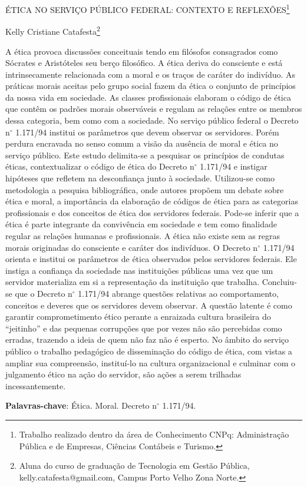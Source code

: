 \documentclass[article,12pt,onesidea,4paper,english,brazil]{abntex2}
\begin{document}
	
	
	\frenchspacing 
	
	\begin{center}
		\LARGE ÉTICA NO SERVIÇO PÚBLICO FEDERAL: CONTEXTO E REFLEXÕES\footnote{Trabalho realizado dentro da área de Conhecimento CNPq: Administração Pública e de Empresas, Ciências Contábeis e Turismo.}
		
		\normalsize
		Kelly Cristiane Catafesta\footnote{Aluna do curso de graduação de Tecnologia em Gestão Pública, kelly.catafesta@gmail.com, Campus Porto Velho Zona Norte.} 
		
	\end{center}
	
	\noindent A ética provoca discussões conceituais tendo em filósofos consagrados como Sócrates e Aristóteles seu berço filosófico. A ética deriva do consciente e está intrinsecamente relacionada com a moral e os traços de caráter do indivíduo. As práticas morais aceitas pelo grupo social fazem da ética o conjunto de princípios da nossa vida em sociedade. As classes profissionais elaboram o código de ética que contêm os padrões morais observáveis e regulam as relações entre os membros dessa categoria, bem como com a sociedade. No serviço público federal o Decreto n$^\circ$ 1.171/94 institui os parâmetros que devem observar os servidores. Porém perdura encravada no senso comum a visão da ausência de moral e ética no serviço público. Este estudo delimita-se a pesquisar os princípios de condutas éticas, contextualizar o código de ética do Decreto n$^\circ$ 1.171/94 e instigar hipóteses que refletem na desconfiança junto à sociedade. Utilizou-se como metodologia a pesquisa bibliográfica, onde autores propõem um debate sobre ética e moral, a importância da elaboração de códigos de ética para as categorias profissionais e dos conceitos de ética dos servidores federais. Pode-se inferir que a ética é parte integrante da convivência em sociedade e tem como finalidade regular as relações humanas e profissionais. A ética não existe sem as regras morais originadas do consciente e caráter dos indivíduos. O Decreto n$^\circ$ 1.171/94 orienta e institui os parâmetros de ética observados pelos servidores federais. Ele instiga a confiança da sociedade nas instituições públicas uma vez que um servidor materializa em si a representação da instituição que trabalha. Concluiu-se que o Decreto n$^\circ$ 1.171/94 abrange questões relativas ao comportamento, conceitos e deveres que os servidores devem observar. A questão latente é como garantir comprometimento ético perante a enraizada cultura brasileira do “jeitinho” e das pequenas corrupções que por vezes não são percebidas como erradas, trazendo a ideia de quem não faz não é esperto. No âmbito do serviço público o trabalho pedagógico de disseminação do código de ética, com vistas a ampliar sua compreensão, instituí-lo na cultura organizacional e culminar com o julgamento ético na ação do servidor, são ações a serem trilhadas incessantemente.
	
	\vspace{\onelineskip}
	
	\noindent
	\textbf{Palavras-chave}: Ética. Moral. Decreto n$^\circ$ 1.171/94.
	
\end{document}
